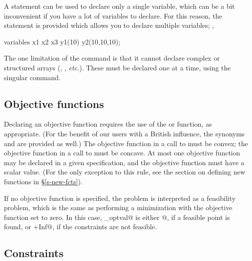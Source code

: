 \documentclass[12pt]{article}
\begin{document}
A \verb@variable@ statement can be used to declare only a single
variable, which can be a bit inconvenient if you have a lot of variables
to declare. For this reason, the \verb@variables@ statement
is provided which allows you to declare multiple variables; \ie,
\begin{code}
	variables x1 x2 x3 y1(10) y2(10,10,10);
\end{code}
The one limitation of the \verb@variables@ command is that it cannot
declare complex or structured arrays (\eg, \verb@symmetric@,
\emph{etc.}). These must be declared
one at a time, using the singular \verb@variable@ command.

\subsection{Objective functions}

Declaring an objective function requires
the use of the \verb@minimize@ or \verb@maximize@ function, as
appropriate. (For the benefit of our users with a British influence,
the synonyms \verb@minimise@ and \verb@maximise@ are provided as well.)
The objective function in a call to \verb@minimize@ 
must be convex; the objective function in a call to \verb@maximize@
must be concave. At most one objective function may be declared in a 
given \cvx specification, and the objective function must have a
scalar value. (For the only exception to this rule, see the 
section on defining new functions in \S\ref{s-new-fcts}).

If no objective function is specified, the problem is interpreted
as a feasibility problem, which is the same as performing a minimization
with the objective function set to zero. In this case, \verb@cvx_optval@
is either @, if a feasible point is found, or
\verb@+Inf@, if the constraints are not feasible.

\subsection{Constraints}
\end{document}
